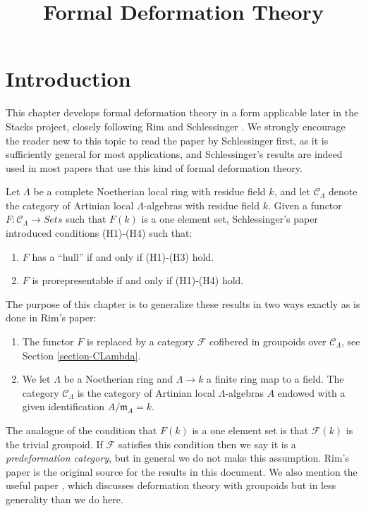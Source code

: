 


%


\title{Formal Deformation Theory}


\maketitle

\label{section-phantom}

\tableofcontents



\section{Introduction}
\label{section-introduction}

\noindent
This chapter develops formal deformation theory in a form applicable
later in the Stacks project, closely following Rim \cite[Exposee VI]{SGA7-I}
and Schlessinger \cite{Sch}. We strongly encourage the reader new to
this topic to read the paper by Schlessinger first, as it is sufficiently
general for most applications, and Schlessinger's results are indeed
used in most papers that use this kind of formal deformation theory.

\medskip\noindent
Let $\Lambda$ be a complete Noetherian local ring with residue field $k$,
and let $\mathcal{C}_\Lambda$ denote the category of Artinian local
$\Lambda$-algebras with residue field $k$. Given a functor
$F : \mathcal{C}_\Lambda \to \textit{Sets}$ such that $F(k)$
is a one element set, Schlessinger's paper introduced conditions
(H1)-(H4) such that:
\begin{enumerate}
\item $F$ has a ``hull'' if and only if (H1)-(H3) hold.
\item $F$ is prorepresentable if and only if (H1)-(H4) hold.
\end{enumerate}
The purpose of this chapter is to generalize these results in two ways
exactly as is done in Rim's paper:
\begin{enumerate}
\item[(A)] The functor $F$ is replaced by a category $\mathcal{F}$ cofibered
in groupoids over $\mathcal{C}_\Lambda$, see
Section \ref{section-CLambda}.
\item[(B)] We let $\Lambda$ be a Noetherian ring and $\Lambda \to k$
a finite ring map to a field. The category $\mathcal{C}_\Lambda$ is
the category of Artinian local $\Lambda$-algebras $A$ endowed with a
given identification $A/\mathfrak m_A = k$.
\end{enumerate}
The analogue of the condition that $F(k)$ is a  one element set is that
$\mathcal{F}(k)$ is the trivial groupoid. If $\mathcal{F}$ satisfies this
condition then we say it is a {\it predeformation category}, but in  general
we do not make this assumption.  Rim's paper \cite[Exposee VI]{SGA7-I} is the
original source for the results in this document. We also mention the useful
paper \cite{Talpo-Vistoli}, which discusses deformation theory with groupoids
but in less generality than we do here.

